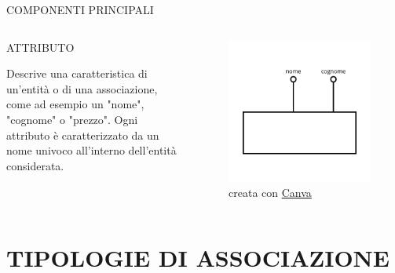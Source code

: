 \documentclass[aspectratio=1610]{beamer}
\begin{document}
\begin{frame}{COMPONENTI PRINCIPALI}
    \begin{columns}
            \begin{alertblock}{ATTRIBUTO}
                \begin{minipage}{0.96\linewidth}
                    \justifying
                    Descrive una caratteristica di un’entità o di una associazione, 
                    come ad esempio un "nome", "cognome" o "prezzo". Ogni 
                    attributo è caratterizzato da un nome univoco all’interno dell’entità considerata.\\
                    \bigskip
                \end{minipage}
            \end{alertblock}
            \begin{figure}
                \includegraphics[width=\linewidth]{img/attributo.png}
                \caption{{creata con \href{www.canva.com}{Canva}}}
            \end{figure}
    \end{columns}
\end{frame}

\section{TIPOLOGIE DI ASSOCIAZIONE}
\end{document}

